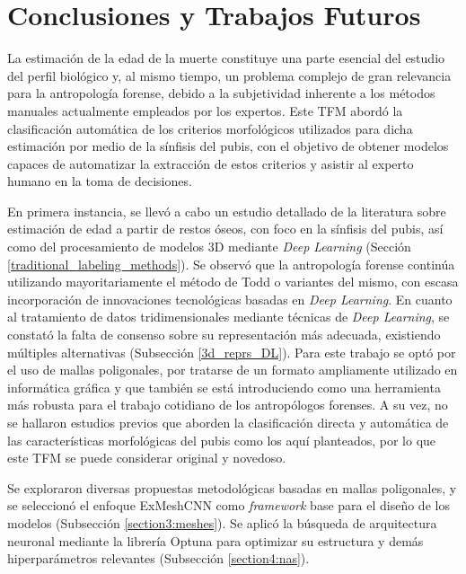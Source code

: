 \chapter{Conclusiones y Trabajos Futuros}

La estimación de la edad de la muerte constituye una parte esencial del estudio del perfil biológico y, al mismo tiempo, un problema complejo de gran relevancia para la antropología forense, debido a la subjetividad inherente a los métodos manuales actualmente empleados por los expertos. Este TFM abordó la clasificación automática de los criterios morfológicos utilizados para dicha estimación por medio de la sínfisis del pubis, con el objetivo de obtener modelos capaces de automatizar la extracción de estos criterios y asistir al experto humano en la toma de decisiones.

En primera instancia, se llevó a cabo un estudio detallado de la literatura sobre estimación de edad a partir de restos óseos, con foco en la sínfisis del pubis, así como del procesamiento de modelos 3D mediante \textit{Deep Learning} (Sección \ref{traditional_labeling_methods}). Se observó que la antropología forense continúa utilizando mayoritariamente el método de Todd \cite{RefWorks:RefID:19-todd1921age} o variantes del mismo, con escasa incorporación de innovaciones tecnológicas basadas en \textit{Deep Learning}. En cuanto al tratamiento de datos tridimensionales mediante técnicas de \textit{Deep Learning}, se constató la falta de consenso sobre su representación más adecuada, existiendo múltiples alternativas (Subsección \ref{3d_reprs_DL}). Para este trabajo se optó por el uso de mallas poligonales, por tratarse de un formato ampliamente utilizado en informática gráfica y que también se está introduciendo como una herramienta más robusta para el trabajo cotidiano de los antropólogos forenses. A su vez, no se hallaron estudios previos que aborden la clasificación directa y automática de las características morfológicas del pubis como los aquí planteados, por lo que este TFM se puede considerar original y novedoso.

Se exploraron diversas propuestas metodológicas basadas en mallas poligonales, y se seleccionó el enfoque ExMeshCNN \cite{kim_exmeshcnn_2022} como \textit{framework} base para el diseño de los modelos (Subsección \ref{section3:meshes}). Se aplicó la búsqueda de arquitectura neuronal mediante la librería Optuna para optimizar su estructura y demás hiperparámetros relevantes (Subsección \ref{section4:nas}).

